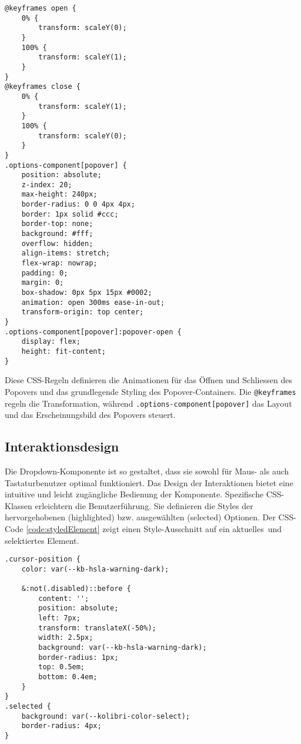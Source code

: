 \begin{lstlisting}[style = htmlcssjs, caption = CSS für das Popover-Element, label = code:popoverStyle]
@keyframes open {
    0% {
        transform: scaleY(0);
    }
    100% {
        transform: scaleY(1);
    }
}
@keyframes close {
    0% {
        transform: scaleY(1);
    }
    100% {
        transform: scaleY(0);
    }
}
.options-component[popover] {
    position: absolute;
    z-index: 20;
    max-height: 240px;
    border-radius: 0 0 4px 4px;
    border: 1px solid #ccc;
    border-top: none;
    background: #fff;
    overflow: hidden;
    align-items: stretch;
    flex-wrap: nowrap;
    padding: 0;
    margin: 0;
    box-shadow: 0px 5px 15px #0002;
    animation: open 300ms ease-in-out;
    transform-origin: top center;
}
.options-component[popover]:popover-open {
    display: flex;
    height: fit-content;
} 
\end{lstlisting}

Diese CSS-Regeln definieren die Animationen für das Öffnen und Schliessen des Popovers und das grundlegende Styling des Popover-Containers.
Die \texttt{@keyframes} regeln die Transformation, während \texttt{.options-component[popover]} das Layout und das Erscheinungsbild des Popovers steuert.


\subsection{Interaktionsdesign}
\label{sec:interactionDesign}

Die Dropdown-Komponente ist so gestaltet, dass sie sowohl für Maus- als auch Tastaturbenutzer optimal funktioniert. 
Das Design der Interaktionen bietet eine intuitive und leicht zugängliche Bedienung der Komponente.
Spezifische CSS-Klassen erleichtern die Benutzerführung.
Sie definieren die Styles der hervorgehobenen (highlighted) bzw. ausgewählten (selected) Optionen.
Der CSS-Code \ref{code:styledElement} zeigt einen Style-Ausschnitt auf ein aktuelles\footnotemark \ und selektiertes Element.

\begin{lstlisting}[style = htmlcssjs, caption = Aktuelle (\texttt{cursor-position}) und ausgewählte (\texttt{selected}) Option, label = code:styledElement]
.cursor-position {
    color: var(--kb-hsla-warning-dark);

    &:not(.disabled)::before {
        content: '';
        position: absolute;
        left: 7px;
        transform: translateX(-50%);
        width: 2.5px;
        background: var(--kb-hsla-warning-dark);
        border-radius: 1px;
        top: 0.5em;
        bottom: 0.4em;
    }
}
.selected {
    background: var(--kolibri-color-select);
    border-radius: 4px;
}
\end{lstlisting}

